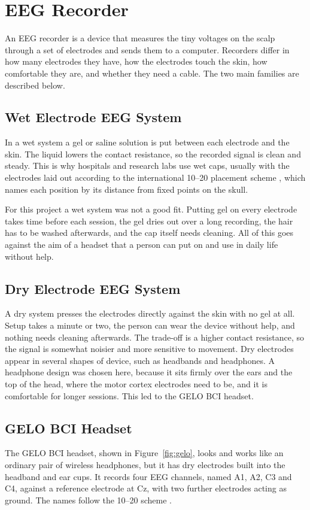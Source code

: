 \section{EEG Recorder}
An EEG recorder is a device that measures the tiny voltages on the scalp through a set of
electrodes and sends them to a computer. Recorders differ in how many electrodes they
have, how the electrodes touch the skin, how comfortable they are, and whether they need a
cable. The two main families are described below.

\subsection{Wet Electrode EEG System}

In a wet system a gel or saline solution is put between each electrode and the skin. The
liquid lowers the contact resistance, so the recorded signal is clean and steady. This is
why hospitals and research labs use wet caps, usually with the electrodes laid out
according to the international 10--20 placement scheme \cite{jasper1958tentwenty}, which
names each position by its distance from fixed points on the skull.

For this project a wet system was not a good fit. Putting gel on every electrode takes
time before each session, the gel dries out over a long recording, the hair has to be
washed afterwards, and the cap itself needs cleaning. All of this goes against the aim of
a headset that a person can put on and use in daily life without help.

\subsection{Dry Electrode EEG System}

A dry system presses the electrodes directly against the skin with no gel at all. Setup
takes a minute or two, the person can wear the device without help, and nothing needs
cleaning afterwards. The trade-off is a higher contact resistance, so the signal is
somewhat noisier and more sensitive to movement. Dry electrodes appear in several shapes
of device, such as headbands and headphones. A headphone design was chosen here, because
it sits firmly over the ears and the top of the head, where the motor cortex electrodes
need to be, and it is comfortable for longer sessions. This led to the GELO BCI headset.

\subsection{GELO BCI Headset}
The GELO BCI headset, shown in Figure~\ref{fig:gelo}, looks and works like an ordinary pair
of wireless headphones, but it has dry electrodes built into the headband and ear cups.
It records four EEG channels, named A1, A2, C3 and C4, against a reference electrode at Cz,
with two further electrodes acting as ground. The names follow the 10--20 scheme
\cite{gelo2026manual}.


